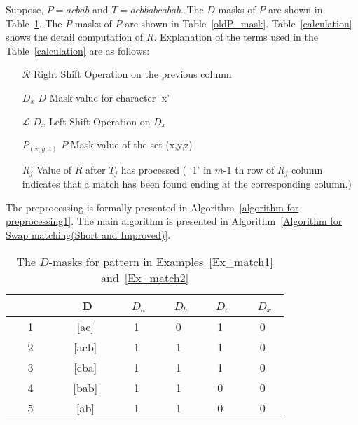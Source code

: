 \documentclass{llncs}
\begin{document}
{\begin{example}\label{Ex_match1}
Suppose, $P = acbab$ and $T = acbbabcabab$. The $D$-masks of
$P$ are shown in Table~\ref{common Dmask}. The $P$-masks of
$P$ are shown in Table~\ref{oldP_mask}. Table~\ref{calculation} shows the detail computation of $R$. Explanation of the terms used in the Table~\ref{calculation} are as follows:   

\begin{itemize}
\item[$\mathcal{R}$] Right Shift Operation on the previous column
\item[$D_x$] $D$-Mask value for character `x'
\item[$\mathcal{L}$ $D_x$] Left Shift Operation on $D_x$
\item[$P_{(x,y,z)}$] $P$-Mask value of the set (x,y,z)
\item[$R_j$] Value of $R$ after $T_j$ has processed ( `1' in $m$-$1$ th row of $R_j$ column indicates that a match has been found ending at the corresponding column.)
\end{itemize}
\end{example}
The preprocessing is formally presented in Algorithm~\ref{algorithm for preprocessing1}. The main algorithm is presented in Algorithm~\ref{Algorithm for Swap matching(Short and Improved)}. 


\begin{table}
\begin{center}
\begin{tabular}{|c|c|c|c|c|c|}
\hline
~ ~ ~ ~ &~ ~ D~ ~ &~ $D_a$~ &~ $D_b$~ &~ $D_c$~ &~ $D_x$~ \\
\hline
1&[ac]&1&0&1&0\\
\hline
2&[acb]&1&1&1&0\\
\hline
3&[cba]&1&1&1&0\\
\hline
4&[bab]&1&1&0&0\\
\hline
5&[ab]&1&1&0&0\\
\hline
\end{tabular}
\caption{The $D$-masks for pattern in Examples~\ref{Ex_match1} and~\ref{Ex_match2} }
\label{common Dmask}
\end{center}
\end{table}

}
\end{document}
